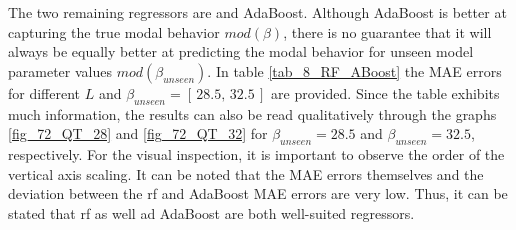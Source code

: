 The two remaining regressors are  and AdaBoost.
Although AdaBoost is better at capturing the true modal behavior $mod(\beta)$, there is no guarantee that it will always be equally better at predicting the modal behavior for unseen model parameter values $mod(\beta_{unseen})$.
In table \ref{tab_8_RF_ABoost} the MAE errors for different $L$ and $\beta_{unseen} = [\, 28.5,\, 32.5\,]$ are provided. 
Since the table exhibits much information, the results can also be read qualitatively through the graphs \ref{fig_72_QT_28} and \ref{fig_72_QT_32} for $\beta_{unseen} = 28.5$ and $\beta_{unseen} = 32.5$, respectively.
For the visual inspection, it is important to observe the order of the vertical axis scaling.
It can be noted that the MAE errors themselves and the deviation between the \gls{rf} and AdaBoost MAE errors are very low.
Thus, it can be stated that \gls{rf} as well ad AdaBoost are both well-suited regressors.\newline 


